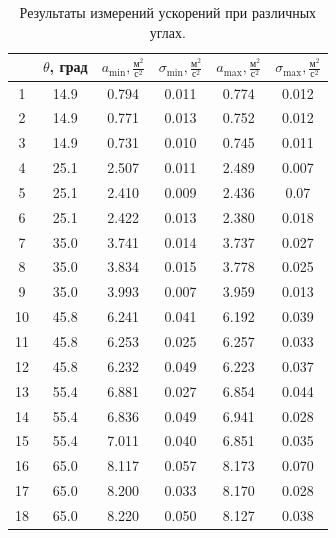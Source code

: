 \documentclass[
	a4paper, %
	12pt, %
]{article}
\begin{document}
	\begin{table}[h]
		\centering
		\begin{tabular}[H]{|c|c|c|c|c|c|}
			\hline
			\textnumero & $\theta$, град & $a_{\min},\frac{\text{м}^2}{\text{с}^2}$ & $\sigma_{\min},\frac{\text{м}^2}{\text{с}^2}$ & $a_{\max},\frac{\text{м}^2}{\text{с}^2}$ & $\sigma_{\max},\frac{\text{м}^2}{\text{с}^2}$  \\
			\hline
			1 & 14.9 & 0.794 & 0.011 & 0.774 & 0.012 \\
			\hline
			2 & 14.9 & 0.771 & 0.013 & 0.752 & 0.012 \\
			\hline
			3 & 14.9 & 0.731 & 0.010 & 0.745 & 0.011 \\
			\hline
			4 & 25.1 & 2.507 & 0.011 & 2.489 & 0.007 \\
			\hline
			5 & 25.1 & 2.410 & 0.009 & 2.436 & 0.07 \\
			\hline
			6 & 25.1 & 2.422 & 0.013 & 2.380 & 0.018 \\
			\hline
			7 & 35.0 & 3.741 & 0.014 & 3.737 & 0.027 \\
			\hline
			8 & 35.0 & 3.834 & 0.015 & 3.778 & 0.025 \\
			\hline
			9 & 35.0 & 3.993 & 0.007 & 3.959 & 0.013 \\
			\hline
			10 & 45.8 & 6.241 & 0.041 & 6.192 & 0.039 \\
			\hline
			11 & 45.8 & 6.253 & 0.025 & 6.257 & 0.033 \\
			\hline
			12 & 45.8 & 6.232 & 0.049 & 6.223 & 0.037 \\
			\hline
			13 & 55.4 & 6.881 & 0.027 & 6.854 & 0.044 \\
			\hline
			14 & 55.4 & 6.836 & 0.049 & 6.941 & 0.028 \\
			\hline
			15 & 55.4 & 7.011 & 0.040 & 6.851 & 0.035 \\
			\hline
			16 & 65.0 & 8.117 & 0.057 & 8.173 & 0.070 \\
			\hline
			17 & 65.0 & 8.200 & 0.033 & 8.170 & 0.028 \\
			\hline
			18 & 65.0 & 8.220 & 0.050 & 8.127 & 0.038 \\
			\hline
		\end{tabular}
		\caption{Результаты измерений ускорений при различных углах.}
		\label{table:2}
	\end{table}
	
\end{document}
